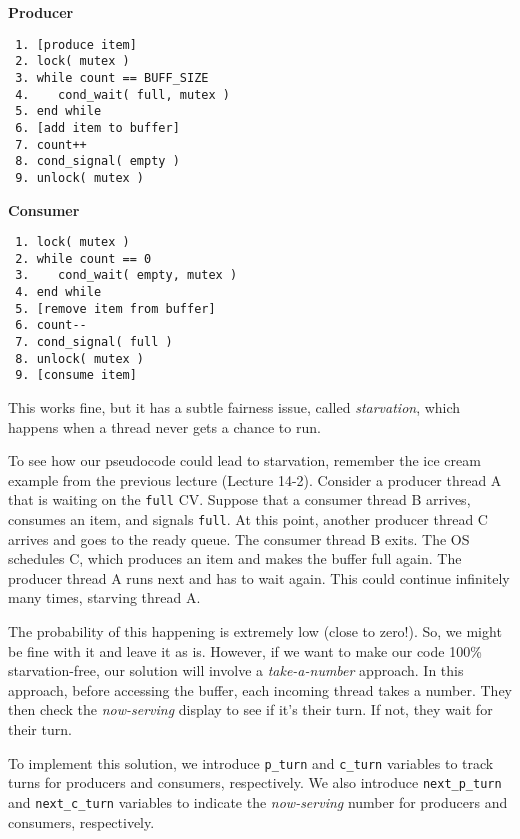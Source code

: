 \begin{multicols}{2}
    \small
    \textbf{Producer}
    \begin{verbatim}
 1. [produce item]
 2. lock( mutex )
 3. while count == BUFF_SIZE
 4.    cond_wait( full, mutex )
 5. end while
 6. [add item to buffer]
 7. count++
 8. cond_signal( empty )
 9. unlock( mutex )
    \end{verbatim}
    \columnbreak
    \textbf{Consumer}\vspace{-2em}
    \begin{verbatim}
 1. lock( mutex )
 2. while count == 0
 3.    cond_wait( empty, mutex )
 4. end while
 5. [remove item from buffer]
 6. count--
 7. cond_signal( full )
 8. unlock( mutex )
 9. [consume item]
    \end{verbatim}
\end{multicols}
\vspace{-2em}

This works fine, but it has a subtle fairness issue, called \emph{starvation}, which happens when a thread never gets a chance to run.

To see how our pseudocode could lead to starvation, remember the ice cream example from the previous lecture (Lecture 14-2).
Consider a producer thread A that is waiting on the \texttt{full} CV.
Suppose that a consumer thread B arrives, consumes an item, and signals \texttt{full}.
At this point, another producer thread C arrives and goes to the ready queue.
The consumer thread B exits.
The OS schedules C, which produces an item and makes the buffer full again.
The producer thread A runs next and has to wait again.
This could continue infinitely many times, starving thread A.

The probability of this happening is extremely low (close to zero!).
So, we might be fine with it and leave it as is.
However, if we want to make our code 100\% starvation-free, our solution will involve a \emph{take-a-number} approach.
In this approach, before accessing the buffer, each incoming thread takes a number.
They then check the \emph{now-serving} display to see if it's their turn.
If not, they wait for their turn.

To implement this solution, we introduce \texttt{p\_turn} and \texttt{c\_turn} variables to track turns for producers and consumers, respectively.
We also introduce \texttt{next\_p\_turn} and \texttt{next\_c\_turn} variables to indicate the \emph{now-serving} number for producers and consumers, respectively.

